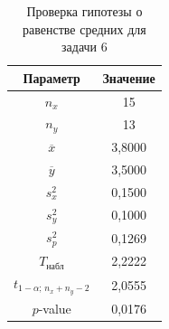 \begin{table}[H]
\centering
\caption{Проверка гипотезы о равенстве средних для задачи 6}
\small
\begin{tabular}{cc}
\toprule
Параметр & Значение \\
\midrule
$n_x$ & 15 \\
$n_y$ & 13 \\
$\overline{x}$ & 3,8000 \\
$\overline{y}$ & 3,5000 \\
$s_x^2$ & 0,1500 \\
$s_y^2$ & 0,1000 \\
$s_p^2$ & 0,1269 \\
$T_{\text{набл}}$ & 2,2222 \\
$t_{1-\alpha;\,n_x+n_y-2}$ & 2,0555 \\
$p$-value & 0,0176 \\
\bottomrule
\end{tabular}
\end{table}
